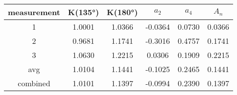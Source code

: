\begin{tabular}{cccccc}
\toprule
measurement&K(135\si{\degree})&K(180\si{\degree})&$a_2$&$a_4$&$A_n$\\
\midrule
1&1.0001&1.0366&-0.0364&0.0730&0.0366\\ 
2&0.9681&1.1741&-0.3016&0.4757&0.1741\\ 
3&1.0630&1.2215&0.0306&0.1909&0.2215\\ 
avg&1.0104&1.1441&-0.1025&0.2465&0.1441\\ 
combined&1.0101&1.1397&-0.0994&0.2390&0.1397\\ 
\bottomrule
\end{tabular} 
